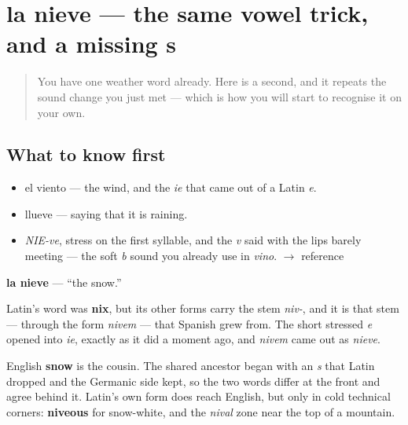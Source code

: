 \section[la nieve]{la nieve — the same vowel trick, and a missing s}

\label{lesson:ES-C278-nieve}



\begin{quote}
You have one weather word already. Here is a second, and it repeats the sound change you just met — which is how you will start to recognise it on your own.
\end{quote}

\subsection*{What to know first}
\begin{itemize}
\raggedright
  \item el viento — the wind, and the \emph{ie} that came out of a Latin \emph{e}.
  \item llueve — saying that it is raining.
\end{itemize}

\begin{sounds}
\begin{itemize}
\raggedright
  \item \emph{NIE-ve}, stress on the first syllable, and the \emph{v} said with the lips barely meeting — the soft \emph{b} sound you already use in \emph{vino}. $\to$ reference
\end{itemize}
\end{sounds}

\begin{cousinweb}
\textbf{la nieve} — \textquotedblleft{}the snow.\textquotedblright{}

Latin's word was \textbf{nix}, but its other forms carry the stem \emph{niv-}, and it is that stem — through the form \emph{nivem} — that Spanish grew from. The short stressed \emph{e} opened into \emph{ie}, exactly as it did a moment ago, and \emph{nivem} came out as \emph{nieve}.

English \textbf{snow} is the cousin. The shared ancestor began with an \emph{s} that Latin dropped and the Germanic side kept, so the two words differ at the front and agree behind it. Latin's own form does reach English, but only in cold technical corners: \textbf{niveous} for snow-white, and the \emph{nival} zone near the top of a mountain.
\end{cousinweb}

